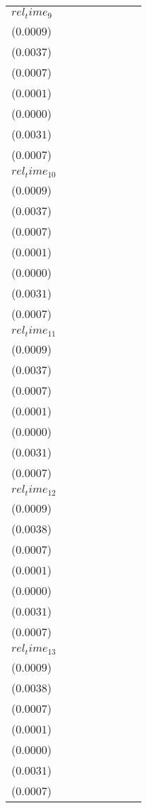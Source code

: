 \begin{tabular}{llllllll}
$rel_time_9$ & \makecell{$0.0052^{***}$ \\ ($0.0009$)} & \makecell{$0.0216^{***}$ \\ ($0.0037$)} & \makecell{$-0.0008^{}$ \\ ($0.0007$)} & \makecell{$-0.0000^{}$ \\ ($0.0001$)} & \makecell{$-0.0000^{}$ \\ ($0.0000$)} & \makecell{$0.0174^{***}$ \\ ($0.0031$)} & \makecell{$0.0043^{***}$ \\ ($0.0007$)} \\
$rel_time_10$ & \makecell{$0.0035^{***}$ \\ ($0.0009$)} & \makecell{$0.0149^{***}$ \\ ($0.0037$)} & \makecell{$0.0007^{}$ \\ ($0.0007$)} & \makecell{$0.0000^{}$ \\ ($0.0001$)} & \makecell{$0.0000^{}$ \\ ($0.0000$)} & \makecell{$0.0122^{***}$ \\ ($0.0031$)} & \makecell{$0.0031^{***}$ \\ ($0.0007$)} \\
$rel_time_11$ & \makecell{$0.0033^{***}$ \\ ($0.0009$)} & \makecell{$0.0129^{***}$ \\ ($0.0037$)} & \makecell{$-0.0012^{*}$ \\ ($0.0007$)} & \makecell{$-0.0000^{}$ \\ ($0.0001$)} & \makecell{$0.0000^{}$ \\ ($0.0000$)} & \makecell{$0.0098^{***}$ \\ ($0.0031$)} & \makecell{$0.0026^{***}$ \\ ($0.0007$)} \\
$rel_time_12$ & \makecell{$0.0027^{***}$ \\ ($0.0009$)} & \makecell{$0.0107^{***}$ \\ ($0.0038$)} & \makecell{$-0.0003^{}$ \\ ($0.0007$)} & \makecell{$-0.0000^{}$ \\ ($0.0001$)} & \makecell{$0.0000^{}$ \\ ($0.0000$)} & \makecell{$0.0106^{***}$ \\ ($0.0031$)} & \makecell{$0.0030^{***}$ \\ ($0.0007$)} \\
$rel_time_13$ & \makecell{$0.0032^{***}$ \\ ($0.0009$)} & \makecell{$0.0132^{***}$ \\ ($0.0038$)} & \makecell{$-0.0011^{}$ \\ ($0.0007$)} & \makecell{$-0.0001^{}$ \\ ($0.0001$)} & \makecell{$0.0000^{}$ \\ ($0.0000$)} & \makecell{$0.0120^{***}$ \\ ($0.0031$)} & \makecell{$0.0032^{***}$ \\ ($0.0007$)} \\

\end{tabular}
